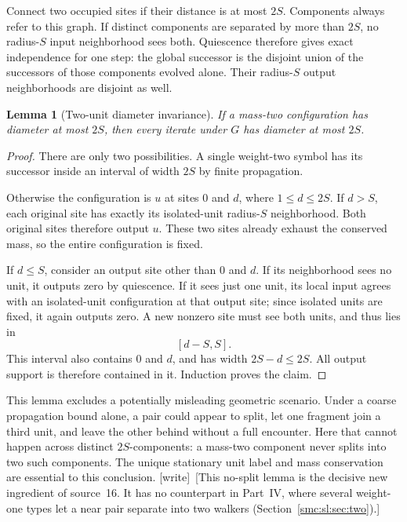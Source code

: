 \documentclass[11pt,letterpaper]{article}
\numberwithin{equation}{section}
\newtheorem{lemma}[theorem]{Lemma}
\theoremstyle{definition}
\theoremstyle{remark}
\newcommand{\wtag}{\textup{[write]}}
\begin{document}
Connect two occupied sites if their distance is at most $2S$. Components always
refer to this graph. If distinct components are separated by more than $2S$,
no radius-$S$ input neighborhood sees both. Quiescence therefore gives exact
independence for one step: the global successor is the disjoint union of the
successors of those components evolved alone. Their radius-$S$ output
neighborhoods are disjoint as well.

\begin{lemma}[Two-unit diameter invariance]\label{smc:su:lem:invariant}
If a mass-two configuration has diameter at most $2S$, then every iterate under
$G$ has diameter at most $2S$.
\end{lemma}
\begin{proof}
There are only two possibilities. A single weight-two symbol has its successor
inside an interval of width $2S$ by finite propagation.

Otherwise the configuration is $u$ at sites $0$ and $d$, where
$1\le d\le2S$. If $d>S$, each original site has exactly its isolated-unit
radius-$S$ neighborhood. Both original sites therefore output $u$.
These two sites already exhaust the conserved mass, so the entire
configuration is fixed.

If $d\le S$, consider an output site other than $0$ and $d$. If its neighborhood
sees no unit, it outputs zero by quiescence. If it sees just one unit, its local
input agrees with an isolated-unit configuration at that output site; since
isolated units are fixed, it again outputs zero. A new nonzero site must see
both units, and thus lies in
\[
 [d-S,S].
\]
This interval also contains $0$ and $d$, and has width $2S-d\le2S$.
All output support is therefore contained in it. Induction proves the claim.
\end{proof}

This lemma excludes a potentially misleading geometric scenario. Under a
coarse propagation bound alone, a pair could appear to split, let one fragment
join a third unit, and leave the other behind without a full encounter.
Here that cannot happen across distinct $2S$-components: a mass-two component
never splits into two such components. The unique stationary unit label and
mass conservation are essential to this conclusion.
\wtag\ [This no-split lemma is the decisive new ingredient of source~16. It has no counterpart in Part~IV, where several weight-one types let a near pair separate into two walkers (Section~\ref{smc:sl:sec:two}).]
\end{document}

